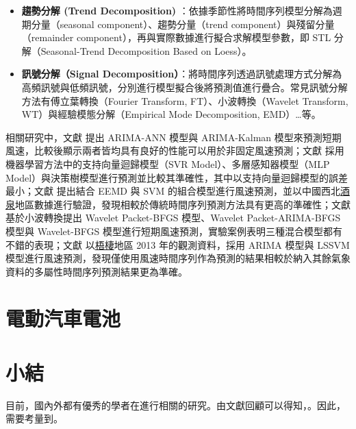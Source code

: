 \begin{itemize}
  \item \textbf{趨勢分解 (Trend Decomposition)} ：依據季節性將時間序列模型分解為週期分量（seasonal component）、趨勢分量（trend component）與殘留分量（remainder component），再與實際數據進行擬合求解模型參數，即 STL 分解（Seasonal-Trend Decomposition Based on Loess）。 \cite{cleveland1990stl}
  \item \textbf{訊號分解（Signal Decomposition）}：將時間序列透過訊號處理方式分解為高頻訊號與低頻訊號，分別進行模型擬合後將預測值進行疊合。常見訊號分解方法有傅立葉轉換（Fourier Transform, FT）、小波轉換（Wavelet Transform, WT）與經驗模態分解（Empirical Mode Decomposition, EMD）…等。 \cite{foster1996wavelets}
\end{itemize}

相關研究中，文獻 \cite{liu2012comparison} 提出 ARIMA-ANN 模型與 ARIMA-Kalman 模型來預測短期風速，比較後顯示兩者皆均具有良好的性能可以用於非固定風速預測；文獻 \cite{kusiak2009short} 採用機器學習方法中的支持向量迴歸模型（SVR Model）、多層感知器模型（MLP Model）與決策樹模型進行預測並比較其準確性，其中以支持向量迴歸模型的誤差最小；文獻 \cite{hu2013hybrid} 提出結合 EEMD 與 SVM 的組合模型進行風速預測，並以中國西北\uline{酒泉}地區數據進行驗證，發現相較於傳統時間序列預測方法具有更高的準確性；文獻 \cite{liu2013forecasting} 基於小波轉換提出 Wavelet Packet-BFGS 模型、Wavelet Packet-ARIMA-BFGS 
模型與 Wavelet-BFGS 模型進行短期風速預測，實驗案例表明三種混合模型都有不錯的表現；文獻 \cite{ting2015windpredict} 以\uline{梧棲}地區 2013 年的觀測資料，採用 ARIMA 模型與 LSSVM 模型進行風速預測，發現僅使用風速時間序列作為預測的結果相較於納入其餘氣象資料的多屬性時間序列預測結果更為準確。

\section{電動汽車電池}


\section{小結}

目前，國內外都有優秀的學者在進行相關的研究。由文獻回顧可以得知，。因此，需要考量到。